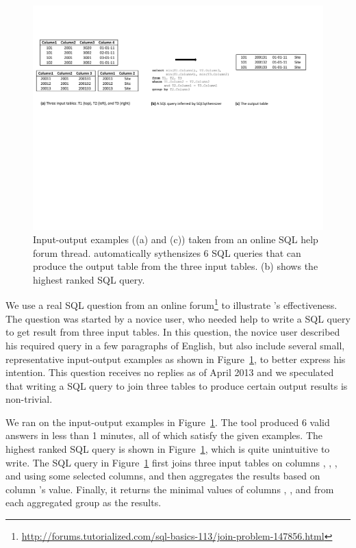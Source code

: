 

\begin{figure}[t]
  \centering
  \includegraphics[scale=0.70]{example2}
  \vspace*{-1.0ex}\caption {{\label{fig:example2} Input-output
  examples ((a) and (c)) taken from an online SQL help forum
  thread. \ourtool automatically sythensizes 6 SQL queries that
  can produce the output table from the three input tables.
  (b) shows the highest ranked SQL query.
}}
\end{figure}

We use a real SQL question from
an online forum\footnote{\url{http://forums.tutorialized.com/sql-basics-113/join-problem-147856.html}} to illustrate
\ourtool's effectiveness.
The question was started by a novice user, who needed help to write a
SQL query to get result from three input tables. In this question, the
novice user described his required query in a few paragraphs of
English, but also include several small, representative input-output
examples as shown in Figure~\ref{fig:example2}, to better express
his intention. 
This question receives no replies as of April 2013 and we speculated that
writing a SQL query to join three tables to produce certain output results
is non-trivial.

We ran \ourtool on the input-output examples
in Figure~\ref{fig:example2}. The tool produced 6 valid answers
in less than 1 minutes, all of which satisfy the given examples. The
highest ranked SQL query is shown in Figure~\ref{fig:example2},
which is quite unintuitive to write. The SQL query in
Figure~\ref{fig:example2}
first joins three input tables
on columns , ,
, and  using some
selected columns, and then aggregates the results based on
column 's value. Finally, it
returns the minimal values of columns , , and 
from each aggregated group as the results.


